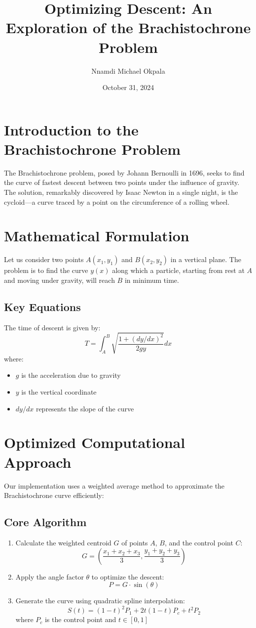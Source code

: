 \documentclass{article}
\title{Optimizing Descent: An Exploration of the Brachistochrone Problem}
\author{Nnamdi Michael Okpala}
\date{October 31, 2024}
\begin{document}
\maketitle

\section{Introduction to the Brachistochrone Problem}
The Brachistochrone problem, posed by Johann Bernoulli in 1696, seeks to find the curve of fastest descent between two points under the influence of gravity. The solution, remarkably discovered by Isaac Newton in a single night, is the cycloid—a curve traced by a point on the circumference of a rolling wheel.

\section{Mathematical Formulation}
Let us consider two points $A(x_1, y_1)$ and $B(x_2, y_2)$ in a vertical plane. The problem is to find the curve $y(x)$ along which a particle, starting from rest at $A$ and moving under gravity, will reach $B$ in minimum time.

\subsection{Key Equations}
The time of descent is given by:
\[
T = \int_{A}^{B} \sqrt{\frac{1 + (dy/dx)^2}{2gy}} dx
\]
where:
\begin{itemize}
    \item $g$ is the acceleration due to gravity
    \item $y$ is the vertical coordinate
    \item $dy/dx$ represents the slope of the curve
\end{itemize}

\section{Optimized Computational Approach}
Our implementation uses a weighted average method to approximate the Brachistochrone curve efficiently:

\subsection{Core Algorithm}
\begin{enumerate}
    \item Calculate the weighted centroid $G$ of points $A$, $B$, and the control point $C$:
    \[
    G = \left(\frac{x_1 + x_2 + x_3}{3}, \frac{y_1 + y_2 + y_3}{3}\right)
    \]
    
    \item Apply the angle factor $\theta$ to optimize the descent:
    \[
    P = G \cdot \sin(\theta)
    \]
    
    \item Generate the curve using quadratic spline interpolation:
    \[
    S(t) = (1-t)^2P_1 + 2t(1-t)P_c + t^2P_2
    \]
    where $P_c$ is the control point and $t \in [0,1]$
\end{enumerate}
\end{document}

